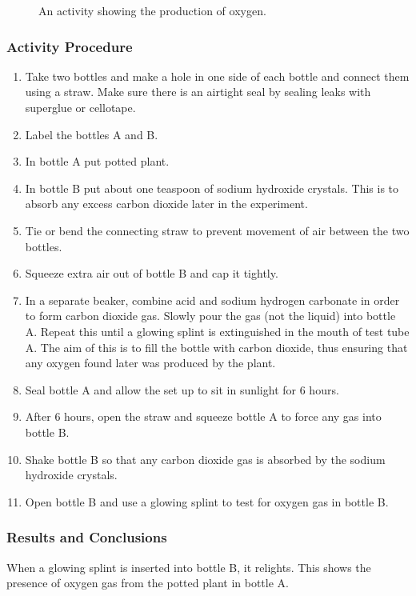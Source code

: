 \begin{figure}[h]
\begin{center}
\def\svgwidth{6cm}

\caption{An activity showing the production of oxygen.}
\label{fig:oxygen}
\end{center}
\end{figure}

\subsubsection*{Activity Procedure}
\begin{enumerate}
\item{Take two bottles and make a hole in one side of each bottle and connect them using a straw. Make sure there is an airtight seal by sealing leaks with superglue or cellotape.}
\item{Label the bottles A and B.}
\item{In bottle A put potted plant.}
\item{In bottle B put about one teaspoon of sodium hydroxide crystals. This is to absorb any excess carbon dioxide later in the experiment.}
\item{Tie or bend the connecting straw to prevent movement of air between the two bottles.}
\item{Squeeze extra air out of bottle B and cap it tightly.}
\item{In a separate beaker, combine acid and sodium hydrogen carbonate in order to form carbon dioxide gas. Slowly pour the gas (not the liquid) into bottle A. Repeat this until a glowing splint is extinguished in the mouth of test tube A. The aim of this is to fill the bottle with carbon dioxide, thus ensuring that any oxygen found later was produced by the plant.}
\item{Seal bottle A and allow the set up to sit in sunlight for 6 hours.}
\item{After 6 hours, open the straw and squeeze bottle A to force any gas into bottle B.}
\item{Shake bottle B so that any carbon dioxide gas is absorbed by the sodium hydroxide crystals.}
\item{Open bottle B and use a glowing splint to test for oxygen gas in bottle B.}
\end{enumerate}

\subsubsection*{Results and Conclusions}
When a glowing splint is inserted into bottle B, it relights. This shows the presence of oxygen gas from the potted plant in bottle A.

